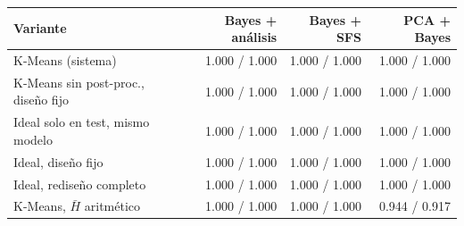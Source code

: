 \footnotesize
\begin{tabular}{lrrr}
\toprule
Variante & Bayes + análisis & Bayes + SFS & PCA + Bayes \\
\midrule
K-Means (sistema) & 1.000 / 1.000 & 1.000 / 1.000 & 1.000 / 1.000 \\
K-Means sin post-proc., diseño fijo & 1.000 / 1.000 & 1.000 / 1.000 & 1.000 / 1.000 \\
Ideal solo en test, mismo modelo & 1.000 / 1.000 & 1.000 / 1.000 & 1.000 / 1.000 \\
Ideal, diseño fijo & 1.000 / 1.000 & 1.000 / 1.000 & 1.000 / 1.000 \\
Ideal, rediseño completo & 1.000 / 1.000 & 1.000 / 1.000 & 1.000 / 1.000 \\
K-Means, $\bar H$ aritmético & 1.000 / 1.000 & 1.000 / 1.000 & 0.944 / 0.917 \\
\bottomrule
\end{tabular}
